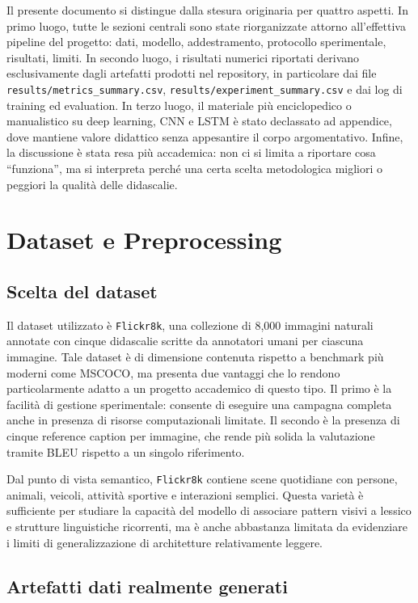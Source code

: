 \documentclass[11pt,a4paper]{report}
\newcommand{\dataset}{\texttt{Flickr8k}}
\begin{document}
Il presente documento si distingue dalla stesura originaria per quattro aspetti. In primo luogo, tutte le sezioni centrali sono state riorganizzate attorno all'effettiva pipeline del progetto: dati, modello, addestramento, protocollo sperimentale, risultati, limiti. In secondo luogo, i risultati numerici riportati derivano esclusivamente dagli artefatti prodotti nel repository, in particolare dai file \texttt{results/metrics\_summary.csv}, \texttt{results/experiment\_summary.csv} e dai log di training ed evaluation. In terzo luogo, il materiale più enciclopedico o manualistico su deep learning, CNN e LSTM è stato declassato ad appendice, dove mantiene valore didattico senza appesantire il corpo argomentativo. Infine, la discussione è stata resa più accademica: non ci si limita a riportare cosa ``funziona'', ma si interpreta perché una certa scelta metodologica migliori o peggiori la qualità delle didascalie.

\chapter{Dataset e Preprocessing}

\section{Scelta del dataset}

Il dataset utilizzato è \dataset{}, una collezione di 8{,}000 immagini naturali annotate con cinque didascalie scritte da annotatori umani per ciascuna immagine. Tale dataset è di dimensione contenuta rispetto a benchmark più moderni come MSCOCO, ma presenta due vantaggi che lo rendono particolarmente adatto a un progetto accademico di questo tipo. Il primo è la facilità di gestione sperimentale: consente di eseguire una campagna completa anche in presenza di risorse computazionali limitate. Il secondo è la presenza di cinque reference caption per immagine, che rende più solida la valutazione tramite BLEU rispetto a un singolo riferimento.

Dal punto di vista semantico, \dataset{} contiene scene quotidiane con persone, animali, veicoli, attività sportive e interazioni semplici. Questa varietà è sufficiente per studiare la capacità del modello di associare pattern visivi a lessico e strutture linguistiche ricorrenti, ma è anche abbastanza limitata da evidenziare i limiti di generalizzazione di architetture relativamente leggere.

\section{Artefatti dati realmente generati}
\end{document}
